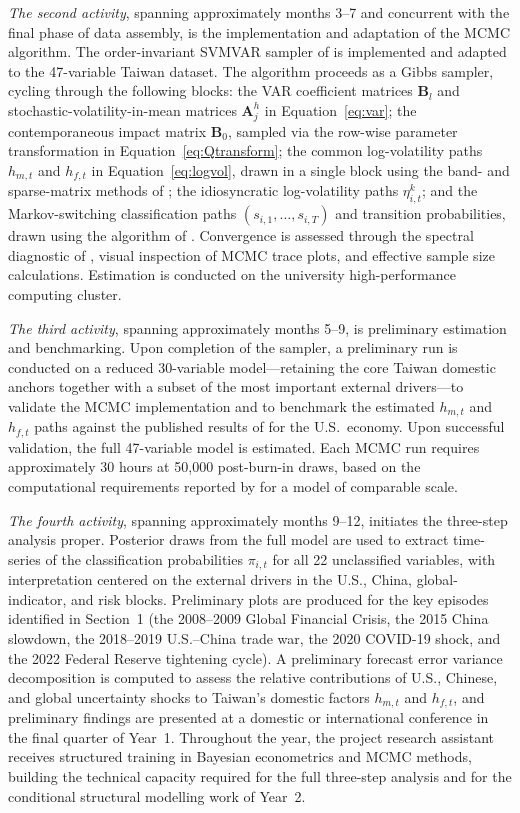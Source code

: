 \indent \textit{The second activity}, spanning approximately months 3--7 and concurrent with the final phase of data assembly, is the implementation and adaptation of the MCMC algorithm. The order-invariant SVMVAR sampler of \citet{davidson2025investigating} is implemented and adapted to the 47-variable Taiwan dataset. The algorithm proceeds as a Gibbs sampler, cycling through the following blocks: the VAR coefficient matrices $\mathbf{B}_l$ and stochastic-volatility-in-mean matrices $\mathbf{A}_j^{h}$ in Equation~\eqref{eq:var}; the contemporaneous impact matrix $\mathbf{B}_0$, sampled via the row-wise parameter transformation in Equation~\eqref{eq:Qtransform}; the common log-volatility paths $h_{m,t}$ and $h_{f,t}$ in Equation~\eqref{eq:logvol}, drawn in a single block using the band- and sparse-matrix methods of \citet{cross2023large}; the idiosyncratic log-volatility paths $\eta_{i,t}^{k}$; and the Markov-switching classification paths $(s_{i,1},\ldots,s_{i,T})$ and transition probabilities, drawn using the algorithm of \citet{chib1996calculating}. Convergence is assessed through the spectral diagnostic of \citet{geweke1992evaluating}, visual inspection of MCMC trace plots, and effective sample size calculations. Estimation is conducted on the university high-performance computing cluster.

\indent \textit{The third activity}, spanning approximately months 5--9, is preliminary estimation and benchmarking. Upon completion of the sampler, a preliminary run is conducted on a reduced 30-variable model---retaining the core Taiwan domestic anchors together with a subset of the most important external drivers---to validate the MCMC implementation and to benchmark the estimated $h_{m,t}$ and $h_{f,t}$ paths against the published results of \citet{davidson2025investigating} for the U.S.\ economy. Upon successful validation, the full 47-variable model is estimated. Each MCMC run requires approximately 30 hours at 50{,}000 post-burn-in draws, based on the computational requirements reported by \citet{davidson2025investigating} for a model of comparable scale.

\indent \textit{The fourth activity}, spanning approximately months 9--12, initiates the three-step analysis proper. Posterior draws from the full model are used to extract time-series of the classification probabilities $\pi_{i,t}$ for all 22 unclassified variables, with interpretation centered on the external drivers in the U.S., China, global-indicator, and risk blocks. Preliminary plots are produced for the key episodes identified in Section~1 (the 2008--2009 Global Financial Crisis, the 2015 China slowdown, the 2018--2019 U.S.--China trade war, the 2020 COVID-19 shock, and the 2022 Federal Reserve tightening cycle). A preliminary forecast error variance decomposition is computed to assess the relative contributions of U.S., Chinese, and global uncertainty shocks to Taiwan's domestic factors $h_{m,t}$ and $h_{f,t}$, and preliminary findings are presented at a domestic or international conference in the final quarter of Year~1. Throughout the year, the project research assistant receives structured training in Bayesian econometrics and MCMC methods, building the technical capacity required for the full three-step analysis and for the conditional structural modelling work of Year~2.

